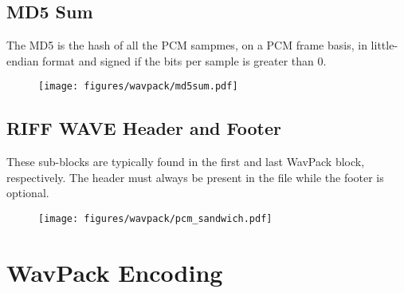 {\subsection{MD5 Sum}
\label{wavpack:md5_sum}
The MD5 is the hash of all the PCM sampmes, on a PCM frame basis,
in little-endian format and signed if the bits per sample is greater than 0.

\begin{figure}[h]
\texttt{[image: figures/wavpack/md5sum.pdf]}
\end{figure}

\subsection{RIFF WAVE Header and Footer}

These sub-blocks are typically found in the first and last
WavPack block, respectively.
The header must always be present in the file while
the footer is optional.

\begin{figure}[h]
\texttt{[image: figures/wavpack/pcm\_sandwich.pdf]}
\end{figure}

\clearpage

\section{WavPack Encoding}

}
